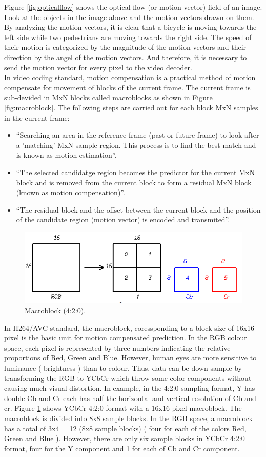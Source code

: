Figure \ref{fig:opticalflow} shows the optical flow (or motion vector) field of an image. Look at the objects in the image above and the motion vectors drawn on them. By analyzing the motion vectors, it is clear that a bicycle is moving towards the left side while two pedestrians are moving towards the right side. The speed of their motion is categorized by the magnitude of the motion vectors and their direction by the angel of the motion vectors. And therefore, it is necessary to send the motion vector for every pixel to the video decoder.\\
 In video coding standard, motion compensation is a practical method of motion compensate for movement of blocks of the current frame. The current frame is sub-devided in MxN blocks called macroblocks as shown in Figure \ref{fig:macroblock}. The following steps are carried out for each block MxN samples in the current frame:
\begin{itemize}
\item “Searching an area in the reference frame (past or future frame) to look after a 'matching' MxN-sample region. This process is to find the best match and is known as motion estimation”.
\item “The selected candidatge region becomes the predictor for the current MxN block and is removed from the current block to form a residual MxN block (known as motion compensation)”.
\item “The residual block and the offset between the current block and the position of the candidate region (motion vector) is encoded and transmited”. 
\end{itemize}
\begin{figure}
\centering
 \includegraphics[width=0.8\linewidth]{Figures/yuv420.png}
 \caption{Macroblock (4:2:0).}
 \label{fig:yuv420}
\end{figure}
	In H264/AVC standard, the macroblock, coressponding to a block size of 16x16 pixel is the basic unit for motion compensated prediction. In the RGB colour space, each pixel is represented by three numbers indicating the relative proportions of Red, Green and Blue. However, human eyes are more sensitive to luminance ( brightness ) than to colour. Thus, data can be down sample by transforming the RGB to YCbCr which throw some color components without causing much visual distortion. In example, in the 4:2:0 sampling format, Y has double Cb and Cr each has half the horizontal and vertical resolution of Cb and cr. Figure \ref{fig:yuv420} shows YCbCr 4:2:0 format with a 16x16 pixel macroblock. The macroblock is divided into 8x8 sample blocks. In the RGB space, a macroblock has a total of 3x4 = 12 (8x8 sample blocks) ( four for each of the colors Red, Green and Blue ). However, there are only six sample blocks in YCbCr 4:2:0 format, four for the Y component and 1 for each of Cb and Cr component.\\

